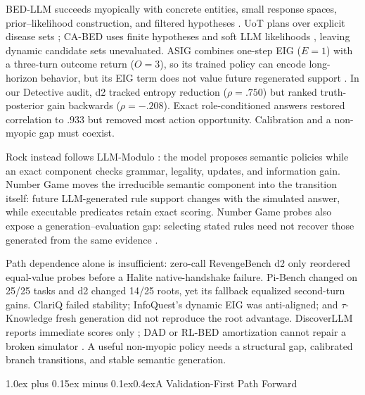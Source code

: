 \documentclass[10pt]{article}
\makeatletter
\renewcommand\section{\@startsection{section}{1}{0pt}%
  {1.0ex plus 0.15ex minus 0.1ex}{0.4ex}{\normalfont\Large\bfseries}}
\makeatother
\begin{document}
BED-LLM succeeds myopically with concrete entities, small response spaces,
prior--likelihood construction, and filtered hypotheses
\citep{choudhury2025bedllm}. UoT plans over explicit disease sets
\citep{hu2024uot}; CA-BED uses finite hypotheses and soft LLM likelihoods
\citep{arnould2026cabed}, leaving dynamic candidate sets unevaluated. ASIG
combines one-step EIG ($E{=}1$) with a three-turn outcome return ($O{=}3$), so
its trained policy can encode long-horizon behavior, but its EIG term does not
value future regenerated support \citep{hartmann2026asig}. In our Detective
audit, d2 tracked entropy reduction
($\rho=.750$) but ranked truth-posterior gain backwards ($\rho=-.208$).
Exact role-conditioned answers restored correlation to $.933$ but removed most
action opportunity. Calibration and a non-myopic gap must coexist.

Rock instead follows LLM-Modulo \citep{kambhampati2024llmmodulo}: the model
proposes semantic policies while an exact component checks grammar, legality,
updates, and information gain. Number Game moves the irreducible semantic
component into the transition itself: future LLM-generated rule support changes
with the simulated answer, while executable predicates retain exact scoring.
Number Game probes also expose a generation--evaluation gap: selecting stated
rules need not recover those generated from the same evidence
\citep{xiong2026hypothesis}.

Path dependence alone is insufficient: zero-call RevengeBench d2 only reordered
equal-value probes before a Halite native-handshake failure. Pi-Bench changed on 25/25 tasks
and d2 changed 14/25 roots, yet its fallback equalized second-turn gains.
ClariQ failed stability; InfoQuest's dynamic EIG was anti-aligned; and
$\tau$-Knowledge fresh generation did not reproduce the root advantage.
DiscoverLLM reports immediate scores only \citep{kim2026discoverllm}; DAD or
RL-BED amortization cannot repair a broken simulator
\citep{foster2021deep,blau2022rlbed}. A useful non-myopic policy needs a
structural gap, calibrated branch transitions, and stable semantic generation.

\section{A Validation-First Path Forward}
\end{document}
